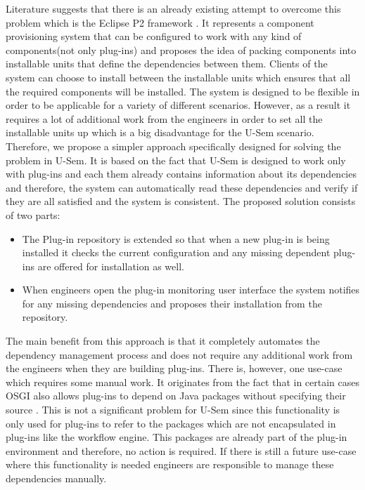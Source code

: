 Literature suggests that there is an already existing attempt to overcome this problem which is the Eclipse P2 framework \cite{le2009dependency}. It represents a component provisioning system that can be configured to work with any kind of components(not only plug-ins) and proposes the idea of packing components into installable units that define the dependencies between them. Clients of the system can choose to install between the installable units which ensures that all the required components will be installed. The system is designed to be flexible in order to be applicable for a variety of different scenarios. However, as a result it requires a lot of additional work from the engineers in order to set all the installable units up which is a big disadvantage for the U-Sem scenario. Therefore, we propose a simpler approach specifically designed for solving the problem in U-Sem. It is based on the fact that U-Sem is designed to work only with plug-ins and each them already contains information about its dependencies and therefore, the system can automatically read these dependencies and verify if they are all satisfied and the system is consistent. The proposed solution consists of two parts:

\begin{itemize}
	\item The Plug-in repository is extended so that when a new plug-in is being installed it checks the current configuration and any missing dependent plug-ins are offered for installation as well.
	\item When engineers open the plug-in monitoring user interface the system notifies for any missing dependencies and proposes their installation from the repository.
\end{itemize}


The main benefit from this approach is that it completely automates the dependency management process and does not require any additional work from the engineers when they are building plug-ins. There is, however, one use-case which requires some manual work. It originates from the fact that in certain cases OSGI also allows plug-ins to depend on Java packages without specifying their source \cite{bartlett2009osgi}. This is not a significant problem for U-Sem since this functionality is only used for plug-ins to refer to the packages which are not encapsulated in plug-ins like the workflow engine. This packages are already part of the plug-in environment and therefore, no action is required. If there is still a future use-case where this functionality is needed engineers are responsible to manage these dependencies manually.


